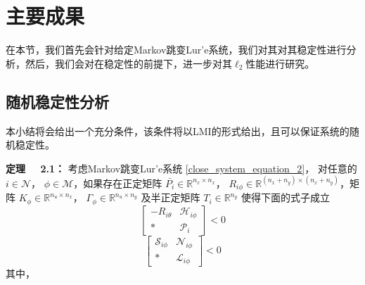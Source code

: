 \section{主要成果}
	在本节，我们首先会针对给定Markov跳变Lur'e系统，我们对其对其稳定性进行分析，然后，我们会对在稳定性的前提下，进一步对其$\ell_2$性能进行研究。

\subsection{随机稳定性分析}
	本小结将会给出一个充分条件，该条件将以LMI的形式给出，且可以保证系统的随机稳定性。
	
	{\bf 定理 \ \ 2.1：}
	考虑Markov跳变Lur'e系统 \eqref{close_system_equation_2}， 对任意的 $i \in \mathcal{N}$， $\phi \in \mathcal{M}$，如果存在正定矩阵 $\bar{P_i} \in \mathbb{R}^{n_x\times n_x}$， $R_{i\phi } \in \mathbb{R}^{(n_x+n_y)\times(n_x+n_y)}$，矩阵 $K_{\phi} \in \mathbb{R}^{n_u\times n_x}$， $\varGamma_{\phi} \in \mathbb{R}^{n_u \times n_y}$ 及半正定矩阵 $T_{i}\in \mathbb{R}^{n_y}$ 使得下面的式子成立
	\begin{equation}\label{condition_1_1}
	\begin{bmatrix}
	-R_{i\theta}&\mathscr{H}_{i\phi}\\
	*&\mathscr{P}_{i}
	\end{bmatrix}<0
	\end{equation}
	\begin{equation}\label{condition_1_2}
	\begin{bmatrix}
	\mathscr{S}_{i\phi}&\mathscr{N}_{i\phi}\\
	*&\mathscr{L}_{i\phi}
	\end{bmatrix}<0
	\end{equation}
	其中，
